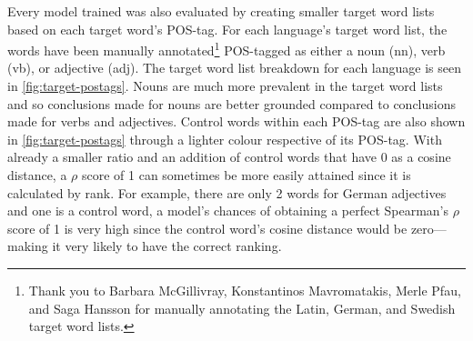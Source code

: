 Every model trained was also evaluated by creating smaller target word lists based on each target word’s POS-tag. For each language’s target word list, the words have been manually annotated\footnote{Thank you to Barbara McGillivray, Konstantinos Mavromatakis, Merle Pfau, and Saga Hansson for manually annotating the Latin, German, and Swedish target word lists.} POS-tagged as either a noun (nn), verb (vb), or adjective (adj). The target word list breakdown for each language is seen in \autoref{fig:target-postags}. Nouns are much more prevalent in the target word lists and so conclusions made for nouns are better grounded compared to conclusions made for verbs and adjectives. Control words within each POS-tag are also shown in \autoref{fig:target-postags} through a lighter colour respective of its POS-tag. With already a smaller ratio and an addition of control words that have 0 as a cosine distance, a $\rho$ score of 1 can sometimes be more easily attained since it is calculated by rank. For example, there are only 2 words for German adjectives and one is a control word, a model’s chances of obtaining a perfect Spearman's $\rho$ score of 1 is very high since the control word's cosine distance would be zero—making it very likely to have the correct ranking. 



